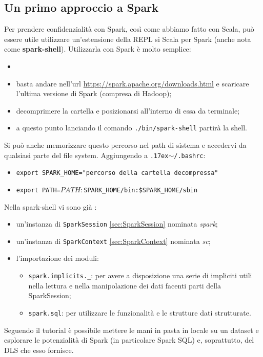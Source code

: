 \documentclass[12pt,italian]{article}
\begin{document}
\subsection{Un primo approccio a Spark}
Per prendere confidenzialità con Spark, così come abbiamo fatto con Scala, può essere utile utilizzare un'estensione della REPL si Scala per Spark (anche nota come \textbf{spark-shell}). 
Utilizzarla con Spark è molto semplice:
\begin{itemize}
	\item \item basta andare nell'url \url{https://spark.apache.org/downloads.html} e scaricare l'ultima versione di Spark (compresa di Hadoop);
	\item decomprimere la cartella e posizionarsi all'interno di essa da terminale;
	\item a questo punto lanciando il comando \texttt{./bin/spark-shell} partirà la shell.
\end{itemize}
Si può anche memorizzare questo percorso nel path di sistema e accedervi da qualsiasi parte del file system. Aggiungendo a \texttt{{\raise.17ex\hbox{$\scriptstyle\sim$}}/.bashrc}:
\begin{itemize}
	\item \texttt{export SPARK\_HOME="percorso della cartella decompressa"} 
	\item \texttt{export PATH=$PATH:$SPARK\_HOME/bin:\$SPARK\_HOME/sbin}
\end{itemize}
Nella spark-shell vi sono già :
\begin{itemize}
	\item un'instanza di \texttt{SparkSession} \ref{sec:SparkSession} nominata \textit{spark};
	\item un'instanza di \texttt{SparkContext} \ref{sec:SparkContext} nominata \textit{sc};
	\item l'importazione dei moduli:
	\begin{itemize}
		\item \texttt{spark.implicits.\_}: per avere a disposizione una serie di impliciti utili nella lettura e nella manipolazione dei dati facenti parti della SparkSession;
		\item \texttt{spark.sql}: per utilizzare le funzionalità e le strutture dati strutturate.
	\end{itemize}
\end{itemize}
Seguendo il tutorial \cite{localexample} è possibile mettere le mani in pasta in locale su un dataset e esplorare le potenzialità di Spark (in particolare Spark SQL) e, soprattutto, del DLS che esso fornisce.
\end{document}
